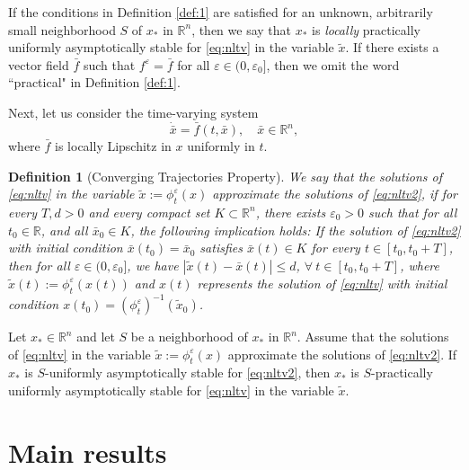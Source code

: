 \documentclass{ifacconf}
\newtheorem{definition}{Definition}
\begin{document}
If the conditions in Definition \ref{def:1} are satisfied for an unknown, arbitrarily small neighborhood $S$ of $x_*$ in $\mathbb{R}^n$, then we say that $x_*$ is \textit{locally} practically uniformly asymptotically stable for \eqref{eq:nltv} in the variable $\tilde{x}$. If there exists a vector field $\bar{f}$ such that $f^\varepsilon=\bar{f}$ for all $\varepsilon\in(0,\varepsilon_0]$, then we omit the word ``practical" in Definition \ref{def:1}.

Next, let us consider the time-varying system
\begin{equation}\label{eq:nltv2}
    \dot{\bar{x}}=\bar{f}(t,\bar{x}),\quad \bar{x}\in\mathbb{R}^n,
\end{equation}
where $\bar{f}$ is locally Lipschitz in $x$ uniformly in $t$.

\begin{definition}[Converging Trajectories Property]
    We say that \textit{the solutions of \eqref{eq:nltv} in the variable $\tilde{x}:=\phi_t^\varepsilon(x)$ approximate the solutions of \eqref{eq:nltv2}}, if for every $T,d>0$ and every compact set $K\subset\mathbb{R}^n$, there exists $\varepsilon_0>0$ such that for all $t_0\in\mathbb{R}$, and all $\bar{x}_0\in K$, the following implication holds: If the solution of \eqref{eq:nltv2} with initial condition $\bar{x}(t_0)=\bar{x}_0$ satisfies $\bar{x}(t)\in K$ for every $t\in[t_0,t_0+T]$, then for all $\varepsilon\in(0,\varepsilon_0]$, we have $|\tilde{x}(t)-\bar{x}(t)|\le d$, $\forall~t\in[t_0,t_0+T]$, where $\tilde{x}(t):=\phi_t^\varepsilon(x(t))$ and $x(t)$ represents the solution of \eqref{eq:nltv} with initial condition $x(t_0)=\left( \phi_t^\varepsilon\right)^{-1}(\tilde{x}_0)$.
   
\end{definition}

\begin{prop}\label{prop:1}
    Let $x_*\in\mathbb{R}^n$ and let $S$ be a neighborhood of $x_*$ in $\mathbb{R}^n$. Assume that the solutions of \eqref{eq:nltv} in the variable $\tilde{x}:=\phi_t^\varepsilon(x)$ approximate the solutions of \eqref{eq:nltv2}. If $x_*$ is $S$-uniformly asymptotically stable for \eqref{eq:nltv2}, then $x_*$ is $S$-practically uniformly asymptotically stable for \eqref{eq:nltv} in the variable $\tilde{x}$.
\end{prop}

\section{Main results}\label{sec:main}
\end{document}
